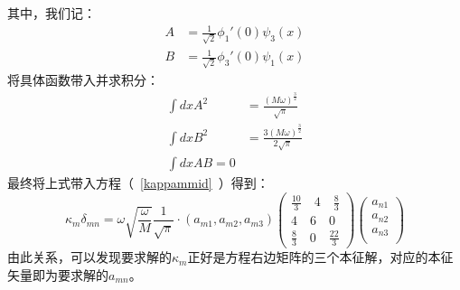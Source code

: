其中，我们记：
\begin{equation}
\begin{split}
A &= \frac{1}{\sqrt{2}}\phi_1'(0)\psi_3(x)\\
B &= \frac{1}{\sqrt{2}} \phi_3'(0)\psi_1(x)
\end{split}
\end{equation}
将具体函数带入并求积分：
\begin{equation}
\begin{split}
    \int dx A^2 &= \frac{(M\omega)^\frac{3}{2}}{\sqrt{\pi}}\\
    \int dx B^2 &= \frac{3 (M\omega)^\frac{3}{2} }{2\sqrt{\pi}} \\
    \int dx AB = 0
\end{split}
\end{equation}
最终将上式带入方程（~\ref{kappammid}~）得到：
\begin{equation}\label{kappammat}
    \kappa_m \delta_{mn} =  \omega \sqrt{\frac{\omega}{M}}\frac{1}{\sqrt{\pi}} \cdot(a_{m1},a_{m2},a_{m3})
            \left(
            \begin{array}{c}
                \frac{10}{3} \quad 4  \quad \frac{8}{3}\\
                4 \quad 6 \quad 0 \\
                \frac{8}{3} \quad 0 \quad \frac{22}{3}
            \end{array}
            \right) 
            \left(
            \begin{array}{c}
                a_{n1}\\
                a_{n2}\\
                a_{n3}\\
            \end{array}
            \right)   
\end{equation} 
由此关系，可以发现要求解的$\kappa_{m}$正好是方程右边矩阵的三个本征解，对应的本征矢量即为要求解的$a_{mn}$。

